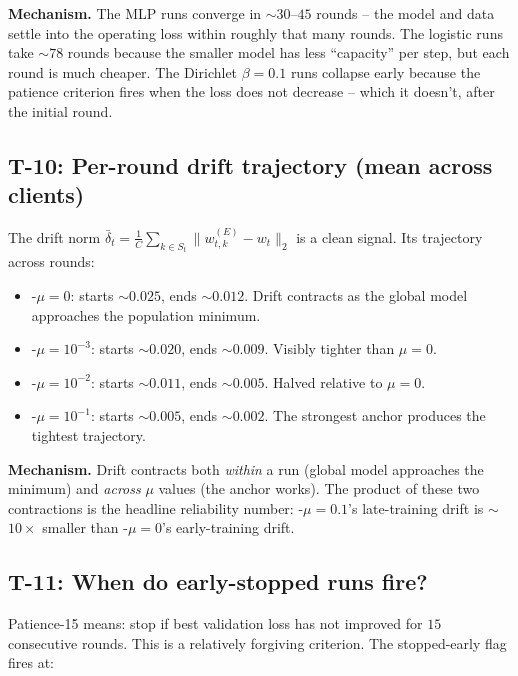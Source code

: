 \textbf{Mechanism.} The MLP \fedprox{} runs converge in
$\sim$$30$--$45$ rounds -- the model and data settle into the
operating loss within roughly that many rounds. The logistic runs
take $\sim$$78$ rounds because the smaller model has less
``capacity'' per step, but each round is much cheaper. The
Dirichlet $\beta\!=\!0.1$ runs collapse early because the patience
criterion fires when the loss does not decrease -- which it
doesn't, after the initial round.

\subsection{T-10: Per-round drift trajectory (mean across clients)}

The drift norm
$\bar\delta_t = \frac{1}{C}\sum_{k\in S_t}\|w_{t,k}^{(E)} - w_t\|_2$
is a clean signal. Its trajectory across rounds:

\begin{itemize}[leftmargin=1.5em, itemsep=2pt, topsep=2pt]
    \item \fedprox{}-$\mu\!=\!0$: starts $\sim$$0.025$, ends
        $\sim$$0.012$. Drift contracts as the global model
        approaches the population minimum.
    \item \fedprox{}-$\mu\!=\!10^{-3}$: starts $\sim$$0.020$,
        ends $\sim$$0.009$. Visibly tighter than $\mu\!=\!0$.
    \item \fedprox{}-$\mu\!=\!10^{-2}$: starts $\sim$$0.011$,
        ends $\sim$$0.005$. Halved relative to $\mu\!=\!0$.
    \item \fedprox{}-$\mu\!=\!10^{-1}$: starts $\sim$$0.005$,
        ends $\sim$$0.002$. The strongest anchor produces
        the tightest trajectory.
\end{itemize}

\textbf{Mechanism.} Drift contracts both \emph{within} a run
(global model approaches the minimum) and \emph{across} $\mu$
values (the anchor works). The product of these two contractions
is the headline reliability number: \fedprox{}-$\mu\!=\!0.1$'s
late-training drift is $\sim$$10\!\times$ smaller than
\fedprox{}-$\mu\!=\!0$'s early-training drift.

\subsection{T-11: When do early-stopped runs fire?}

Patience-15 means: stop if best validation loss has not improved
for $15$ consecutive rounds. This is a relatively forgiving
criterion. The stopped-early flag fires at:


